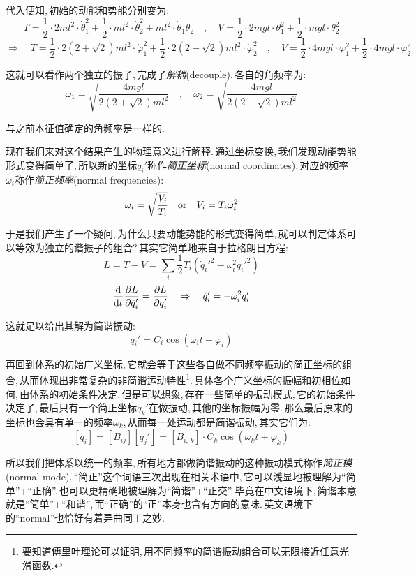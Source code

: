 代入便知,\,初始的动能和势能分别变为:
\[T=\frac{1}{2}\cdot 2ml^2\cdot\dot{\theta}_1^2+\frac{1}{2}\cdot ml^2\cdot\dot{\theta}_2^2+ml^2\cdot\dot{\theta}_1\dot{\theta}_2 \quad,\quad V=\frac{1}{2}\cdot 2mgl\cdot{\theta}_1^2+\frac{1}{2}\cdot mgl\cdot{\theta}_2^2\]
\[\Rightarrow \quad T=\frac{1}{2}\cdot 2(2+\sqrt{2})ml^2\cdot \dot{\varphi}_1^2+\frac{1}{2}\cdot 2(2-\sqrt{2})ml^2\cdot \dot{\varphi}_2^2\quad,\quad V=\frac{1}{2}\cdot 4mgl\cdot \varphi_1^2+\frac{1}{2}\cdot 4mgl\cdot \varphi_2^2\]

这就可以看作两个独立的振子,\,完成了\emph{解耦}(decouple).\,各自的角频率为:
\[\omega_1=\sqrt{\frac{4mgl}{2(2+\sqrt{2})ml^2}}\quad,\quad \omega_2=\sqrt{\frac{4mgl}{2(2-\sqrt{2})ml^2}}\]

与之前本征值确定的角频率是一样的.

现在我们来对这个结果产生的物理意义进行解释.\,通过坐标变换,\,我们发现动能势能形式变得简单了,\,所以新的坐标$q_i'$称作\emph{简正坐标}(normal coordinates).\,对应的频率$\omega_i$称作\emph{简正频率}(normal frequencies):
\[\omega_i=\sqrt\frac{V_i}{T_i}\quad {\rm or}\quad V_i=T_i\omega_i^2 \]

于是我们产生了一个疑问,\,为什么只要动能势能的形式变得简单,\,就可以判定体系可以等效为独立的谐振子的组合?\,其实它简单地来自于拉格朗日方程:
\[L=T-V=\sum_i\frac{1}{2}T_i(\dot{q}_i'^2-\omega_i^2q_i'^2)\]
\[\frac{\textrm{d} }{\textrm{d} t}\frac{\partial L}{\partial \dot{q}_i'}=\frac{\partial L}{\partial {q}_i'}\quad \Rightarrow \quad \ddot{q}'_i=-\omega_i^2q_i'\]

这就足以给出其解为简谐振动:
\[q_i'=C_i\cos(\omega_i t+\varphi_i)\]

再回到体系的初始广义坐标,\,它就会等于这些各自做不同频率振动的简正坐标的组合,\,从而体现出非常复杂的非简谐运动特性\footnote{要知道傅里叶理论可以证明,\,用不同频率的简谐振动组合可以无限接近任意光滑函数.}.\,具体各个广义坐标的振幅和初相位如何,\,由体系的初始条件决定.\,但是可以想象,\,存在一些简单的振动模式,\,它的初始条件决定了,\,最后只有一个简正坐标$q_k'$在做振动,\,其他的坐标振幅为零.\,那么最后原来的坐标也会具有单一的频率$\omega_k$,\,从而每一处运动都是简谐振动,\,其实它们为:
\[[q_i]=[B_{ij}][q_j']=[B_{i,\,k}]\cdot C_k\cos(\omega_k t+\varphi_k)\]

所以我们把体系以统一的频率,\,所有地方都做简谐振动的这种振动模式称作\emph{简正模}(normal mode).\,``简正''这个词语三次出现在相关术语中,\,它可以浅显地被理解为``简单''+``正确''.\,也可以更精确地被理解为``简谐''+``正交''.\,毕竟在中文语境下,\,简谐本意就是``简单''+``和谐'',\,而``正确''的``正''本身也含有方向的意味.\,英文语境下的``normal''也恰好有着异曲同工之妙.

